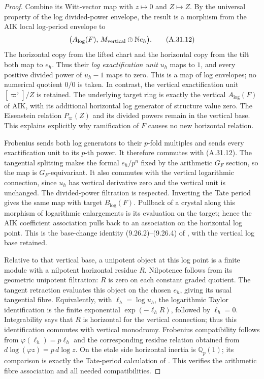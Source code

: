 \begin{proof}
Combine its Witt-vector map with \(z\mapsto0\)
and \(Z\mapsto Z\). By the universal property of
the log divided-power envelope, the result is
a morphism from the AIK local log-period
envelope to
\[
       \bigl(A_{\log}(F),\,
                         M_{\rm vertical}\oplus\mathbb N e_h\bigr).
                                                        \tag{A.31.12}
\]
The horizontal copy from the lifted chart and the
horizontal copy from the tilt both map to \(e_h\).
Thus their \emph{log exactification unit} \(u_h\)
maps to \(1\), and every positive divided power
of \(u_h-1\) maps to zero. This is a map of log
envelopes; no numerical quotient \(0/0\) is taken.
In contrast, the vertical exactification unit
\([\varpi^\flat]/Z\) is retained. The underlying
target ring is exactly the vertical \(A_{\log}(F)\)
of AIK, with its additional horizontal log
generator of structure value zero. The
Eisenstein relation \(P_\varpi(Z)\) and its
divided powers remain in the vertical base.
This explains explicitly why ramification of
\(F\) causes no new horizontal relation.

Frobenius sends both log generators to their
\(p\)-fold multiples and sends every
exactification unit to its \(p\)-th power.
It therefore commutes with (A.31.12).
The tangential splitting makes the formal
\(e_h/p^n\) fixed by the arithmetic \(G_F\)
section, so the map is \(G_F\)-equivariant.
It also commutes with the vertical logarithmic
connection, since \(u_h\) has vertical derivative
zero and the vertical unit is unchanged.
The divided-power filtration is respected.
Inverting the Tate period gives the same map
with target \(B_{\log}(F)\).
Pullback of a crystal along this morphism of
logarithmic enlargements is its evaluation
on the target; hence the AIK coefficient
association pulls back to an association on
the horizontal log point. This is the
base-change identity (9.26.2)--(9.26.4) of
\cite{fghOlssonTangential}, with the vertical
log base retained.

Relative to that vertical base, a unipotent
object at this log point is a finite module
with a nilpotent horizontal residue \(R\).
Nilpotence follows from its geometric
unipotent filtration: \(R\) is zero on each
constant graded quotient. The tangent
retraction evaluates this object on the
chosen \(e_h\), giving its usual tangential
fibre. Equivalently, with
\(\ell_h=\log u_h\), the logarithmic Taylor
identification is the finite exponential
\(\exp(-\ell_hR)\), followed by
\(\ell_h=0\). Integrability says that \(R\)
is horizontal for the vertical connection;
thus this identification commutes with
vertical monodromy. Frobenius compatibility
follows from \(\varphi(\ell_h)=p\ell_h\)
and the corresponding residue relation
obtained from \(d\log(\varphi z)=p\,d\log z\).
On the etale side horizontal inertia is
\(\mathbb Q_p(1)\); its comparison is exactly
the Tate-period calculation of
\cite[Proposition 9.5, Corollary 9.16, and
Section 9.24]{fghOlssonTangential}.
This verifies the arithmetic fibre
association and all needed compatibilities.


\end{proof}
